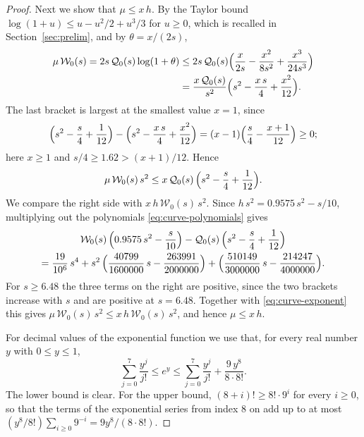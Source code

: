 \documentclass{amsart}
\theoremstyle{definition}
\theoremstyle{remark}
\numberwithin{equation}{section}
\begin{document}
\begin{proof}
Next we show that $\mu\le x\,h$. By the Taylor bound
$\log(1+u)\le u-u^2/2+u^3/3$ for $u\ge0$, which is recalled in
Section~\ref{sec:prelim}, and by $\theta=x/(2s)$,
\begin{align*}
\mu\,\mathcal W_0(s)=2s\,\mathcal Q_0(s)\log(1+\theta)
&\le2s\,\mathcal Q_0(s)
\Bigl(\frac{x}{2s}-\frac{x^2}{8s^2}+\frac{x^3}{24s^3}\Bigr)\\
&=\frac{x\,\mathcal Q_0(s)}{s^2}
\Bigl(s^2-\frac{x\,s}{4}+\frac{x^2}{12}\Bigr).
\end{align*}
The last bracket is largest at the smallest value $x=1$, since
\[
\Bigl(s^2-\frac s4+\frac{1}{12}\Bigr)
-\Bigl(s^2-\frac{x\,s}{4}+\frac{x^2}{12}\Bigr)
=(x-1)\Bigl(\frac s4-\frac{x+1}{12}\Bigr)\ge0 ;
\]
here $x\ge1$ and $s/4\ge1.62>(x+1)/12$. Hence
\begin{equation}\label{eq:curve-exponent}
\mu\,\mathcal W_0(s)\,s^2\le x\,\mathcal Q_0(s)\,
\Bigl(s^2-\frac s4+\frac{1}{12}\Bigr).
\end{equation}
We compare the right side with $x\,h\,\mathcal W_0(s)\,s^2$. Since
$h\,s^2=0.9575\,s^2-s/10$, multiplying out the polynomials
\eqref{eq:curve-polynomials} gives
\begin{multline*}
\mathcal W_0(s)\,\Bigl(0.9575\,s^2-\frac{s}{10}\Bigr)
-\mathcal Q_0(s)\,\Bigl(s^2-\frac s4+\frac{1}{12}\Bigr)\\
=\frac{19}{10^{6}}\,s^4
+s^2\,\Bigl(\frac{40799}{1600000}\,s-\frac{263991}{2000000}\Bigr)
+\Bigl(\frac{510149}{3000000}\,s-\frac{214247}{4000000}\Bigr).
\end{multline*}
For $s\ge6.48$ the three terms on the right are positive, since the two
brackets increase with $s$ and are positive at $s=6.48$. Together with
\eqref{eq:curve-exponent} this gives
$\mu\,\mathcal W_0(s)\,s^2\le x\,h\,\mathcal W_0(s)\,s^2$, and hence
$\mu\le x\,h$.

For decimal values of the exponential function
we use that, for every real number $y$ with $0\le y\le1$,
\begin{equation}\label{eq:curve-taylor}
\sum_{j=0}^{7}\frac{y^j}{j!}\le e^{y}\le
\sum_{j=0}^{7}\frac{y^j}{j!}+\frac{9\,y^8}{8\cdot8!}.
\end{equation}
The lower bound is clear. For the upper bound, $(8+i)!\ge8!\cdot9^{i}$ for
every $i\ge0$, so that the terms of the exponential series from index $8$ on
add up to at most $(y^8/8!)\sum_{i\ge0}9^{-i}=9y^8/(8\cdot8!)$.


\end{proof}
\end{document}
